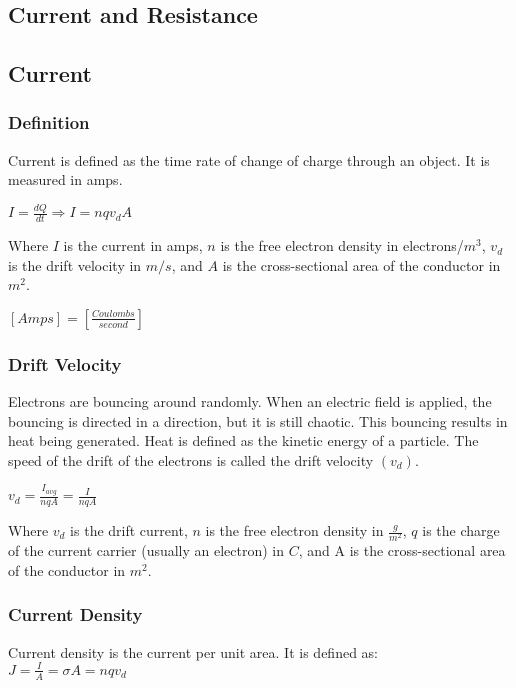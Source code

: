 \begin{center}
    \section{Current and Resistance}
    \hrulefill
    \subsection*{Current}
\end{center}

\subsubsection*{Definition}
\hspace{.5cm} Current is defined as the time rate of change of charge through an object. It is measured in amps.

\vbox{
    \center
    $I=\frac{dQ}{dt} \Rightarrow I = nqv_dA$
}\vspace{12pt}

Where $I$ is the current in amps, $n$ is the free electron density in electrons/$m^3$, 
$v_d$ is the drift velocity in $m/s$, and $A$ is the cross-sectional area of the conductor in $m^2$.

\vbox {
    \center
    $[Amps] = [\frac{Coulombs}{second}]$
}


\subsubsection*{Drift Velocity}
Electrons are bouncing around randomly. When an electric field is applied, the bouncing is directed 
in a direction, but it is still chaotic. This bouncing results in heat being generated. Heat is defined 
as the kinetic energy of a particle. The speed of the drift of the electrons is called the drift velocity $(v_d)$.

\vbox{
    \center
    $v_d = \frac{I_{avg}}{nqA} = \frac{I}{nqA}$\\
}\vspace{12pt}

Where $v_d$ is the drift current, $n$ is the free electron density in $\frac{g}{m^2}$, $q$ is the charge of the current carrier 
(usually an electron) in $C$, and A is the cross-sectional area of the conductor in $m^2$.


\pagebreak



\subsubsection*{Current Density}
\hspace{.5cm} Current density is the current per unit area. It is defined as:\\
\vbox{
    \center
    $J = \frac{I}{A} = \sigma A = nqv_d$
}\vspace{12pt}

